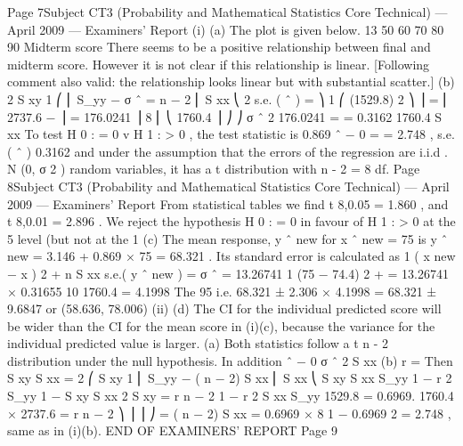 Page 7Subject CT3 (Probability and Mathematical Statistics Core Technical) — April 2009 — Examiners’ Report
(i)
(a)
The plot is given below.
13
50
60
70
80
90
Midterm score
There seems to be a positive relationship between final and midterm
score. However it is not clear if this relationship is linear.
[Following comment also valid: the relationship looks linear but with
substantial scatter.]
(b)
2
S xy
1 ⎛
⎜ S_{yy} −
σ ˆ =
n − 2 ⎜
S xx
⎝
2
s.e. ( \beta  ˆ ) =
⎞ 1 ⎛
(1529.8) 2 ⎞
⎟ = ⎜ 2737.6 −
⎟ = 176.0241
⎟ 8 ⎜ ⎝
1760.4 ⎟ ⎠
⎠
σ ˆ 2
176.0241
=
= 0.3162
1760.4
S xx
To test H 0 : \beta  = 0 v H 1 : \beta  > 0 , the test statistic is
0.869
\beta  ˆ − 0
=
= 2.748 ,
s.e.( \beta  ˆ ) 0.3162
and under the assumption that the errors of the regression are
i.i.d . N (0, σ 2 ) random variables, it has a t distribution
with n - 2 = 8 df.
Page 8Subject CT3 (Probability and Mathematical Statistics Core Technical) — April 2009 — Examiners’ Report
From statistical tables we find t 8,0.05 = 1.860 , and t 8,0.01 = 2.896 .
We reject the hypothesis H 0 : \beta  = 0 in favour of H 1 : \beta  > 0 at the 5%
level (but not at the 1%
(c)
The mean response, y ˆ new for x ˆ new = 75 is
y ˆ new = 3.146 + 0.869 × 75 = 68.321 .
Its standard error is calculated as
1 ( x new − x ) 2
+
n
S xx
s.e.( y ˆ new ) = σ ˆ
= 13.26741
1 (75 − 74.4) 2
+
= 13.26741 × 0.31655
10
1760.4
= 4.1998
The 95%
i.e. 68.321 ± 2.306 × 4.1998 = 68.321 ± 9.6847
or (58.636, 78.006)
(ii)
(d) The CI for the individual predicted score will be wider than the CI for
the mean score in (i)(c), because the variance for the individual
predicted value is larger.
(a) Both statistics follow a t n - 2 distribution under the null hypothesis.
In addition
\beta  ˆ − 0
σ ˆ 2
S xx
(b)
r =
Then
S xy
S xx
=
2
⎛
S xy
1
⎜ S_{yy} −
( n − 2) S xx ⎜
S xx
⎝
S xy
S xx S_{yy}
1 − r
2
S_{yy} 1 −
S xy
S xx
2
S xy
=
r n − 2
1 − r 2
S xx S_{yy}
1529.8
= 0.6969.
1760.4 × 2737.6
=
r n − 2
⎞
⎟
⎟
⎠
=
( n − 2) S xx
=
0.6969 × 8
1 − 0.6969
2
= 2.748 , same as in (i)(b).
END OF EXAMINERS’ REPORT
Page 9

